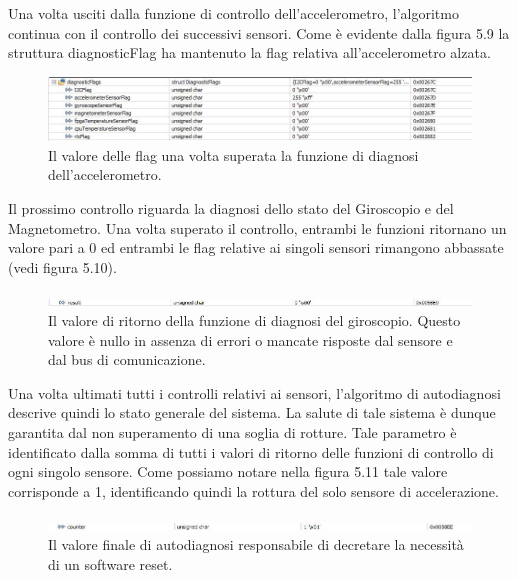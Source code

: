 \documentclass[LaM,binding=0.6cm,oneside]{../sapthesis}
\begin{document}
Una volta usciti dalla funzione di controllo dell'accelerometro, l'algoritmo continua con il controllo dei successivi sensori. Come è evidente dalla figura 5.9 la struttura diagnosticFlag ha mantenuto la flag relativa all'accelerometro alzata.
\newline
\begin{figure}[htbp]
\centerline{\includegraphics[scale=0.6]{examples/6_accelerometerIdBad.JPG}}
\caption{Il valore delle flag una volta superata la funzione di diagnosi dell'accelerometro.}
\label{fig}
\end{figure}

Il prossimo controllo riguarda la diagnosi dello stato del Giroscopio e del Magnetometro. Una volta superato il controllo, entrambi le funzioni ritornano un valore pari a 0 ed entrambi le flag relative ai singoli sensori rimangono abbassate (vedi figura 5.10).\newpage
\begin{figure}[htbp]
\centerline{\includegraphics[scale=0.6]{examples/7_GiroscopioResultGoodI2CAndGoodMagnetometerId.JPG}}
\caption{Il valore di ritorno della funzione di diagnosi del giroscopio. Questo valore è nullo in assenza di errori o mancate risposte dal sensore e dal bus di comunicazione.}
\label{fig}
\end{figure}

Una volta ultimati tutti i controlli relativi ai sensori, l'algoritmo di autodiagnosi descrive quindi lo stato generale del sistema. La salute di tale sistema è dunque garantita dal non superamento di una soglia di rotture. Tale parametro è identificato dalla somma di tutti i valori di ritorno delle funzioni di controllo di ogni singolo sensore. Come possiamo notare nella figura 5.11 tale valore corrisponde a 1, identificando quindi la rottura del solo sensore di accelerazione.\newline
\begin{figure}[htbp]
\centerline{\includegraphics[scale=0.6]{examples/8_giroscopioCounterRimaneAUno.JPG}}
\caption{Il valore finale di autodiagnosi responsabile di decretare la necessità di un software reset. }
\label{fig}
\end{figure}
\end{document}
